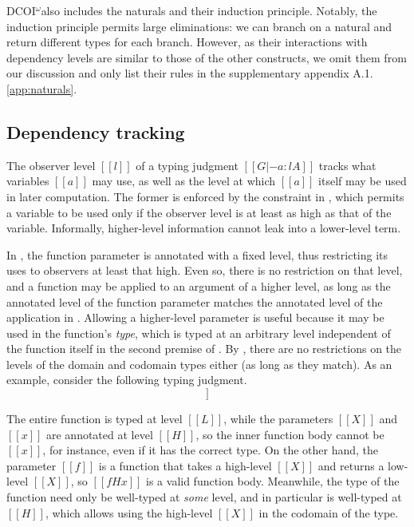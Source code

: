 \documentclass[acmsmall, screen=true, nonacm=true,
  review=\ifpublic false\else true\fi,
  anonymous=\ifanonymous true\else false\fi
]{acmart}
\makeatletter
\newcommand{\name}{\texorpdfstring{DCOI$^{\omega}$\@\xspace}{DCOI-omega}}
\makeatother
\begin{document}
\name also includes the naturals and their induction principle.  Notably, the
induction principle permits large eliminations: we can branch on a natural and
return different types for each branch.  However, as their interactions with
dependency levels are similar to those of the other constructs, we omit them
from our discussion and only list their rules in
\ifsubmission the supplementary appendix A.1.
\else \cref{app:naturals}.
\fi

\subsection{Dependency tracking} \label{sec:dep}

The observer level $[[l]]$ of a typing judgment $[[G |- a : l A]]$
tracks what variables $[[a]]$ may use, as well as the level at which $[[a]]$ itself may be used in later computation.
The former is enforced by the constraint in ,
which permits a variable to be used only if the observer level is at least as high as that of the variable.
Informally, higher-level information cannot leak into a lower-level term.

In , the function parameter is annotated with a fixed level,
thus restricting its uses to observers at least that high.
Even so, there is no restriction on that level,
and a function may be applied to an argument of a higher level,
as long as the annotated level of the function parameter
matches the annotated level of the application in .
Allowing a higher-level parameter is useful because it may be used in the function's \emph{type},
which is typed at an arbitrary level independent of the function itself
in the second premise of .
By , there are no restrictions on the levels of the domain and codomain types either
(as long as they match).
As an example, consider the following typing judgment.
%
{
\setlength{\abovedisplayskip}{0pt}
\setlength{\belowdisplayskip}{0pt}
\begin{displaymath}
  [[:concrete: nil |- (\ H X . \ H x . \ L f . f H x) : L (Pi X : H Univ i . H X -> L (H X -> X) -> X)]]
\end{displaymath}
}

The entire function is typed at level $[[L]]$,
while the parameters $[[X]]$ and $[[x]]$ are annotated at level $[[H]]$,
so the inner function body cannot be $[[x]]$,
for instance, even if it has the correct type.
On the other hand, the parameter $[[f]]$ is a function that takes a high-level $[[X]]$
and returns a low-level $[[X]]$, so $[[f H x]]$ is a valid function body.
Meanwhile, the type of the function need only be well-typed at \emph{some} level,
and in particular is well-typed at $[[H]]$,
which allows using the high-level $[[X]]$
in the codomain of the type.
\end{document}
